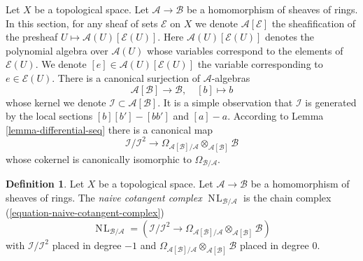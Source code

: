 \documentclass{stacks-project}
\theoremstyle{plain}
\theoremstyle{definition}
\newtheorem{definition}[subsection]{Definition}
\theoremstyle{remark}
\numberwithin{equation}{subsection}
\def\NL{\mathop{N\!L}\nolimits}
\begin{document}
\medskip\noindent
Let $X$ be a topological space. Let $\mathcal{A} \to \mathcal{B}$ be a
homomorphism of sheaves of rings. In this section, for any sheaf of sets
$\mathcal{E}$ on $X$ we denote $\mathcal{A}[\mathcal{E}]$ the sheafification
of the presheaf $U \mapsto \mathcal{A}(U)[\mathcal{E}(U)]$. Here
$\mathcal{A}(U)[\mathcal{E}(U)]$
denotes the polynomial algebra over $\mathcal{A}(U)$
whose variables correspond to the elements of $\mathcal{E}(U)$.
We denote $[e] \in \mathcal{A}(U)[\mathcal{E}(U)]$ the variable
corresponding to $e \in \mathcal{E}(U)$.
There is a canonical surjection of $\mathcal{A}$-algebras
\begin{equation}
\label{equation-canonical-presentation}
\mathcal{A}[\mathcal{B}] \longrightarrow \mathcal{B},\quad [b] \longmapsto b
\end{equation}
whose kernel we denote $\mathcal{I} \subset \mathcal{A}[\mathcal{B}]$.
It is a simple observation that $\mathcal{I}$ is generated by the
local sections $[b][b'] - [bb']$ and $[a] - a$. According to
Lemma \ref{lemma-differential-seq} there is a canonical map
\begin{equation}
\label{equation-naive-cotangent-complex}
\mathcal{I}/\mathcal{I}^2
\longrightarrow
\Omega_{\mathcal{A}[\mathcal{B}]/\mathcal{A}}
\otimes_{\mathcal{A}[\mathcal{B}]} \mathcal{B}
\end{equation}
whose cokernel is canonically isomorphic to $\Omega_{\mathcal{B}/\mathcal{A}}$.

\begin{definition}
\label{definition-naive-cotangent-complex}
Let $X$ be a topological space. Let $\mathcal{A} \to \mathcal{B}$ be a
homomorphism of sheaves of rings. The {\it naive cotangent complex}
$\NL_{\mathcal{B}/\mathcal{A}}$ is the chain complex
(\ref{equation-naive-cotangent-complex})
$$
\NL_{\mathcal{B}/\mathcal{A}} =
\left(\mathcal{I}/\mathcal{I}^2
\longrightarrow
\Omega_{\mathcal{A}[\mathcal{B}]/\mathcal{A}}
\otimes_{\mathcal{A}[\mathcal{B}]} \mathcal{B}\right)
$$
with $\mathcal{I}/\mathcal{I}^2$ placed in degree $-1$ and
$\Omega_{\mathcal{A}[\mathcal{B}]/\mathcal{A}}
\otimes_{\mathcal{A}[\mathcal{B}]} \mathcal{B}$
placed in degree $0$.
\end{definition}
\end{document}
